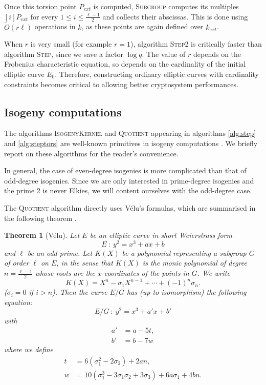 \documentclass{article}
\newcommand{\softO}{\tilde{O}}
\newcommand{\algstyle}[1]{\textsc{#1}}
\newtheorem{theorem}{Theorem}[section]
\theoremstyle{definition}
\begin{document}
Once this torsion point $P_{ext}$ is computed, \algstyle{Subgroup} computes its
multiples $[i]P_{ext}$ for every $1\leq i\leq \frac{\ell - 1}{2}$ and collects
their abscissas. This is done using $\softO(r\ell)$ operations in $k$, as
these points are again defined over $k_{ext}$.

When $r$ is very small (for example $r = 1$), algorithm \algstyle{Step2} is
critically faster than algorithm \algstyle{Step}, since we save a factor $\log q$.
The value of $r$ depends on the Frobenius characteristic equation, so depends on
the cardinality of the initial elliptic curve $E_0$. Therefore, constructing
ordinary elliptic curves with cardinality constraints becomes critical to allowing
better cryptosystem performances.

\subsection{Isogeny computations}

The algorithms \algstyle{IsogenyKernel} and \algstyle{Quotient} appearing in
algorithms \ref{alg:step} and \ref{alg:steptors} are well-known primitives in isogeny
computations \cite{}. We briefly report on these algorithms
for the reader's convenience. 

In general, the case of even-degree isogenies is
more complicated than that of odd-degree isogenies. Since we are only
interested in prime-degree isogenies and the prime 2 is never Elkies, we
will content ourselves with the odd-degree case.

The \algstyle{Quotient} algorithm directly uses Vélu's formulas, which are
summarised in the following theorem \cite{}.
\begin{theorem}[Vélu]
Let $E$ be an elliptic curve in short Weierstrass form
\[
E\ :\ y^2 = x^3 + a x + b
\]
and $\ell$ be an odd prime. Let $K(X)$ be a polynomial representing a subgroup $G$
of order $\ell$ on $E$, in the sense that $K(X)$ is the monic polynomial of degree
$n = \frac{\ell - 1}{2}$ whose roots are the $x$-coordinates of the points in $G$.
We write
\[
K(X) = X^n - \sigma_1 X^{n-1} + \cdots + (-1)^n \sigma_n.
\]
($\sigma_i = 0$ if $i>n$).
Then the curve $E/G$ has (up to isomorphism) the following equation:
\[
E/G\ :\ y^2 = x^3 + a' x + b'
\]
with
\[
\begin{aligned}
a' &= a - 5t,\\
b' &= b - 7w
\end{aligned}
\]
where we define
\[
\begin{aligned}
t &= 6 (\sigma_1^2 - 2\sigma_2) + 2 a n,\\
w &= 10 (\sigma_1^3 - 3 \sigma_1\sigma_2 + 3\sigma_3) + 6 a\sigma_1 + 4bn.
\end{aligned}
\]


\end{theorem}
\end{document}

